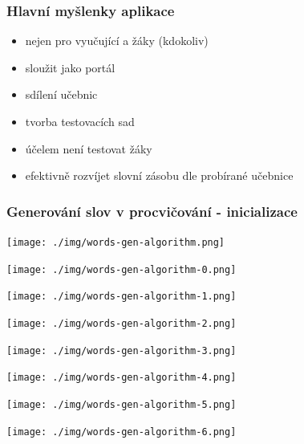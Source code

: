 \begin{frame}[t]
    \frametitle{Hlavní myšlenky aplikace}
    \begin{itemize}[<+->]
        \item nejen pro vyučující a žáky (kdokoliv)
        \item sloužit jako portál
        \item sdílení učebnic
        \item tvorba testovacích sad
        \item účelem není testovat žáky
        \item efektivně rozvíjet slovní zásobu dle probírané učebnice
    \end{itemize}
\end{frame}

\begin{frame}[t]
    \frametitle{Generování slov v procvičování - inicializace}
     {\begin{center}\texttt{[image: ./img/words-gen-algorithm.png]}\end{center}}
     {\begin{center}\texttt{[image: ./img/words-gen-algorithm-0.png]}\end{center}}
     {\begin{center}\texttt{[image: ./img/words-gen-algorithm-1.png]}\end{center}}
     {\begin{center}\texttt{[image: ./img/words-gen-algorithm-2.png]}\end{center}}
     {\begin{center}\texttt{[image: ./img/words-gen-algorithm-3.png]}\end{center}}
     {\begin{center}\texttt{[image: ./img/words-gen-algorithm-4.png]}\end{center}}
     {\begin{center}\texttt{[image: ./img/words-gen-algorithm-5.png]}\end{center}}
     {\begin{center}\texttt{[image: ./img/words-gen-algorithm-6.png]}\end{center}}
\end{frame}

